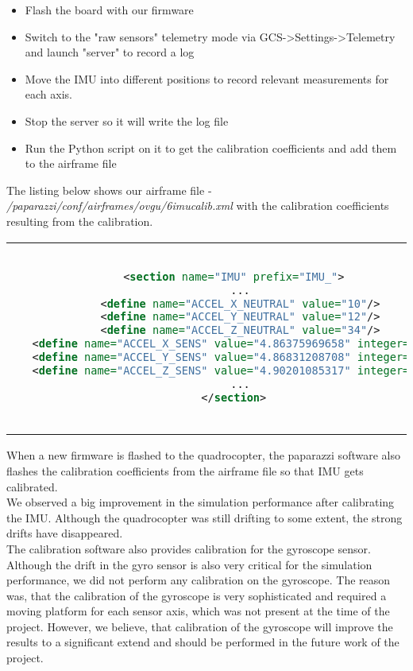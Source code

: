 \begin{itemize}
\item{Flash the board with our firmware}
\item{Switch to the "raw sensors" telemetry mode via GCS->Settings->Telemetry and launch "server" to record a log}
\item{Move the IMU into different positions to record relevant measurements for each axis. }
\item{Stop the server so it will write the log file}
\item{Run the Python script on it to get the calibration coefficients and add them to the airframe file}
\end{itemize}


The listing below shows our airframe file - \textit{/paparazzi/conf/airframes/ovgu/6imucalib.xml} with the calibration coefficients resulting from the calibration.

\begin{center}
\begin{tabular}{c}
\begin{lstlisting}[basicstyle=\small, language=XML, caption={Paparazzi calibration}]

 <section name="IMU" prefix="IMU_">
   ...
   <define name="ACCEL_X_NEUTRAL" value="10"/>
   <define name="ACCEL_Y_NEUTRAL" value="12"/>
   <define name="ACCEL_Z_NEUTRAL" value="34"/>
   <define name="ACCEL_X_SENS" value="4.86375969658" integer="16"/>
   <define name="ACCEL_Y_SENS" value="4.86831208708" integer="16"/>
   <define name="ACCEL_Z_SENS" value="4.90201085317" integer="16"/>
   ...
 </section>
        
\end{lstlisting}
\end{tabular}
\end{center}

When a new firmware is flashed to the quadrocopter, the paparazzi software also flashes the calibration coefficients from the airframe file so that IMU gets calibrated. \\

We observed a big improvement in the simulation performance after calibrating the IMU. Although the quadrocopter was still drifting to some extent, the strong drifts have disappeared. \\

The calibration software also provides calibration for the gyroscope sensor. 
Although the drift in the gyro sensor is also very critical for the simulation performance, we did not perform any calibration on the gyroscope. 
The reason was, that the calibration of the gyroscope is very sophisticated and required a moving platform for each sensor axis, which was not present at the time of the project. 
However, we believe, that calibration of the gyroscope will improve the results to a significant extend and should be performed in the future work of the project.


